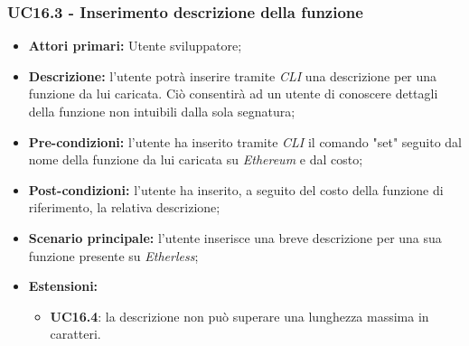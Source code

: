 \subsubsection{UC16.3 - Inserimento descrizione della funzione}
\begin{itemize}
	\item \textbf{Attori primari:} Utente sviluppatore;
	\item \textbf{Descrizione:} l'utente potrà inserire tramite \textit{CLI} una descrizione per una funzione da lui caricata. Ciò consentirà ad un utente di conoscere dettagli della funzione non intuibili dalla sola segnatura; 
	\item \textbf{Pre-condizioni:} l'utente ha inserito tramite \textit{CLI\glo} il comando "set" seguito dal nome della funzione da lui caricata su \textit{Ethereum} e dal costo;
	\item \textbf{Post-condizioni:} l'utente ha inserito, a seguito del costo della funzione di riferimento, la relativa descrizione;
	\item \textbf{Scenario principale:} l'utente inserisce una breve descrizione per una sua funzione presente su \textit{Etherless};
	\item \textbf{Estensioni:} 
	\begin{itemize}
		\item \textbf{UC16.4}: la descrizione non può superare una lunghezza massima in caratteri.
	\end{itemize}
\end{itemize}